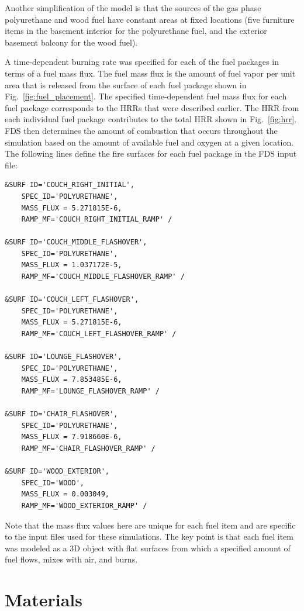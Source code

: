 \documentclass[12pt,oneside]{book}
\begin{document}
Another simplification of the model is that the sources of the gas phase polyurethane and wood fuel have constant areas at fixed locations (five furniture items in the basement interior for the polyurethane fuel, and the exterior basement balcony for the wood fuel).

A time-dependent burning rate was specified for each of the fuel packages in terms of a fuel mass flux. The fuel mass flux is the amount of fuel vapor per unit area that is released from the surface of each fuel package shown in Fig.~\ref{fig:fuel_placement}. The specified time-dependent fuel mass flux for each fuel package corresponds to the HRRs that were described earlier. The HRR from each individual fuel package contributes to the total HRR shown in Fig.~\ref{fig:hrr}. FDS then determines the amount of combustion that occurs throughout the simulation based on the amount of available fuel and oxygen at a given location. The following lines define the fire surfaces for each fuel package in the FDS input file:

\begin{lstlisting}
&SURF ID='COUCH_RIGHT_INITIAL',
    SPEC_ID='POLYURETHANE',
    MASS_FLUX = 5.271815E-6,
    RAMP_MF='COUCH_RIGHT_INITIAL_RAMP' /

&SURF ID='COUCH_MIDDLE_FLASHOVER',
    SPEC_ID='POLYURETHANE',
    MASS_FLUX = 1.037172E-5,
    RAMP_MF='COUCH_MIDDLE_FLASHOVER_RAMP' /

&SURF ID='COUCH_LEFT_FLASHOVER',
    SPEC_ID='POLYURETHANE',
    MASS_FLUX = 5.271815E-6,
    RAMP_MF='COUCH_LEFT_FLASHOVER_RAMP' /

&SURF ID='LOUNGE_FLASHOVER',
    SPEC_ID='POLYURETHANE',
    MASS_FLUX = 7.853485E-6,
    RAMP_MF='LOUNGE_FLASHOVER_RAMP' /

&SURF ID='CHAIR_FLASHOVER',
    SPEC_ID='POLYURETHANE',
    MASS_FLUX = 7.918660E-6,
    RAMP_MF='CHAIR_FLASHOVER_RAMP' /

&SURF ID='WOOD_EXTERIOR',
    SPEC_ID='WOOD',
    MASS_FLUX = 0.003049,
    RAMP_MF='WOOD_EXTERIOR_RAMP' /
\end{lstlisting}

Note that the mass flux values here are unique for each fuel item and are specific to the input files used for these simulations. The key point is that each fuel item was modeled as a 3D object with flat surfaces from which a specified amount of fuel flows, mixes with air, and burns.


\clearpage


\section{Materials}
\label{sec:materials}
\end{document}
